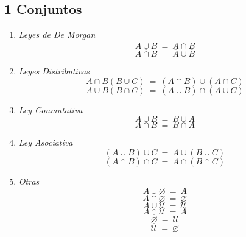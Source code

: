 \documentclass{article}
\newcommand{\eq}{\:=\:}                                 %
\begin{document}
\subsection*{1 Conjuntos}
\begin{enumerate}
    \item \emph{Leyes de De Morgan}
    \begin{equation*}
        \overline{A \cup B} \eq \overline{A} \cap \overline{B}
    \end{equation*}
    \begin{equation*}
        \overline{A \cap B} \eq \overline{A} \cup \overline{B}
    \end{equation*}
    \item \emph{Leyes Distributivas}
    \begin{equation*}
        A \cap B (B \cup C) \eq (A \cap B) \cup (A \cap C)
    \end{equation*}
    \begin{equation*}
        A \cup B (B \cap C) \eq (A \cup B) \cap (A \cup C)
    \end{equation*}
    \item \emph{Ley Conmutativa}
    \begin{equation*}
        A \cup B \eq B \cup A
    \end{equation*}
    \begin{equation*}
        A \cap B \eq B \cap A
    \end{equation*}
    \item \emph{Ley Asociativa}
    \begin{equation*}
        (A \cup B) \cup C \eq A \cup (B \cup C)
    \end{equation*}
    \begin{equation*}
        (A \cap B) \cap C \eq A \cap (B \cap C)
    \end{equation*}
    \item \emph{Otras}
    \begin{equation*}
        A \cup \varnothing \eq A
    \end{equation*}
    \begin{equation*}
        A \cap \varnothing \eq \varnothing
    \end{equation*}
    \begin{equation*}
        A \cup \mathcal{U} \eq \mathcal{U}
    \end{equation*}
    \begin{equation*}
        A \cap \mathcal{U} \eq A
    \end{equation*}
    \begin{equation*}
        \overline{\varnothing} \eq \mathcal{U}
    \end{equation*}
    \begin{equation*}
        \overline{\mathcal{U}} \eq \varnothing
    \end{equation*}
\end{enumerate}
\end{document}
